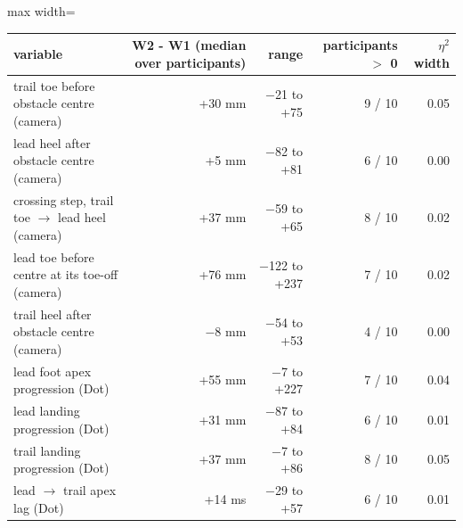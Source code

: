\begin{adjustbox}{max width=\textwidth}
{\footnotesize
\begin{tabular}{p{5.6cm}rrrr}
\toprule
\textbf{variable} & \textbf{W2 - W1 (median over participants)} & \textbf{range} & \textbf{participants $>$ 0} & \textbf{$\eta^2$ width} \\
\midrule
trail toe before obstacle centre (camera) & +30 mm & $-$21 to +75 & 9 / 10 & 0.05 \\
lead heel after obstacle centre (camera) & +5 mm & $-$82 to +81 & 6 / 10 & 0.00 \\
crossing step, trail toe $\rightarrow$ lead heel (camera) & +37 mm & $-$59 to +65 & 8 / 10 & 0.02 \\
lead toe before centre at its toe-off (camera) & +76 mm & $-$122 to +237 & 7 / 10 & 0.02 \\
trail heel after obstacle centre (camera) & $-$8 mm & $-$54 to +53 & 4 / 10 & 0.00 \\
lead foot apex progression (Dot) & +55 mm & $-$7 to +227 & 7 / 10 & 0.04 \\
lead landing progression (Dot) & +31 mm & $-$87 to +84 & 6 / 10 & 0.01 \\
trail landing progression (Dot) & +37 mm & $-$7 to +86 & 8 / 10 & 0.05 \\
lead $\rightarrow$ trail apex lag (Dot) & +14 ms & $-$29 to +57 & 6 / 10 & 0.01 \\
\bottomrule
\end{tabular}
}
\end{adjustbox}
